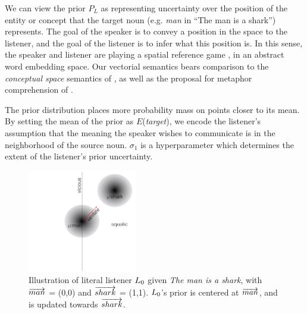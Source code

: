 \documentclass[9pt,twocolumn,twoside,lineno]{pnas-new}
\begin{document}
		We can view the prior $P_L$ as representing uncertainty over the position of the entity or concept that the target noun (e.g. \emph{man} in ``The man is a shark'') represents.
		The goal of the speaker is to convey a position in the space 
		to the listener, and the goal of the listener is to infer what this position is. In this sense, the speaker and listener are playing a spatial reference game  \cite{golland2010game}, in an abstract word embedding space. Our vectorial semantics bears comparison to the \emph{conceptual space} semantics of \cite{gardenfors2004conceptual}, as well as the proposal for metaphor comprehension of \cite{kintsch2000metaphor}.

		
		

		The prior distribution places more probability mass on points closer to its mean. By setting the mean of the prior as $E$(\emph{target}), we encode the listener's assumption that the meaning the speaker wishes to communicate is in the neighborhood of the source noun. $\sigma_1$ is a hyperparameter which determines the extent of the listener's prior uncertainty.

		\begin{figure}[htbp]
		\centering
		\includegraphics[height=4.5cm]{images/diagram1.png}
		   
		  \caption{Illustration of literal listener $L\protect_0$ given \emph{The man is a shark}, with $\protect\overrightarrow{man}$ = (0,0) and $\protect\overrightarrow{shark}$ = (1,1). $L\protect_0$'s prior is centered at $\protect\overrightarrow{man}$, and is updated towards $\protect\overrightarrow{shark}$.}
		  \label{fig:2d}
		\end{figure}
\end{document}
